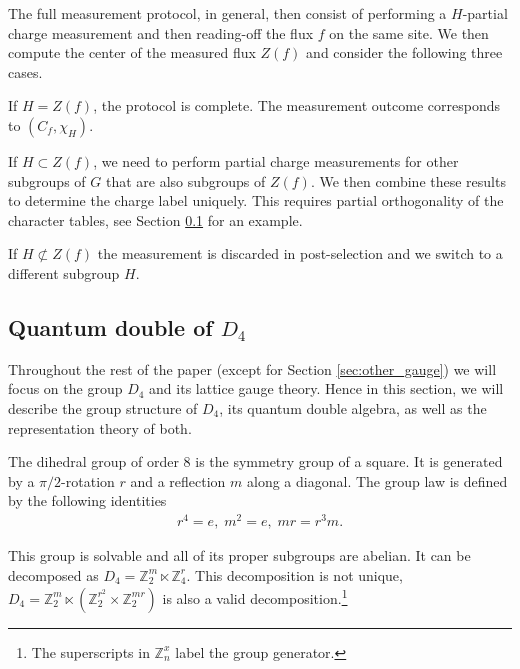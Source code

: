 \documentclass[a4paper,twocolumn,11pt]{quantumarticle}
\begin{document}
The full measurement protocol, in general, then consist of performing a $H$-partial charge measurement and then reading-off the flux $f$ on the same site. We then compute the center of the measured flux $Z(f)$ and consider the following three cases.

If $H = Z(f)$, the protocol is complete. The measurement outcome corresponds to $(C_f, \chi_H)$.

If $H \subset Z(f)$, we need to perform partial charge measurements for other subgroups of $G$ that are also subgroups of $Z(f)$. We then combine these results to determine the charge label uniquely. This requires partial orthogonality of the character tables, see Section \ref{sec:D4_double} for an example.

If $H \not\subset Z(f)$ the measurement is discarded in post-selection and we switch to a different subgroup $H$.


\subsection{Quantum double of $D_4$}\label{sec:D4_double}

Throughout the rest of the paper (except for Section \ref{sec:other_gauge}) we will focus on the group $D_4$ and its lattice gauge theory.
Hence in this section, we will describe the group structure of $D_4$, its quantum double algebra, as well as the representation theory of both.

The dihedral group of order 8 is the symmetry group of a square. It is generated by a $\pi/2$-rotation $r$ and a reflection  $m$ along a diagonal.
The group law is defined by the following identities
\begin{equation}
	\begin{split}
		r^4 = e,\;
		m^2 = e,	\;	mr = r^3m. \label{eqn:group}
	\end{split}
\end{equation}

This group is solvable and all of its proper subgroups are abelian. It can be decomposed as $D_4 = \mathbb{Z}^m_2 \ltimes \mathbb{Z}^r_4$.
This decomposition is not unique, $D_4 = \mathbb{Z}_2^m\ltimes(\mathbb{Z}_2^{r^2}\times\mathbb{Z}^{mr}_2)$ is also a valid decomposition.\footnote{The superscripts in $\mathbb{Z}_n^x$ label the group generator.}
\end{document}
